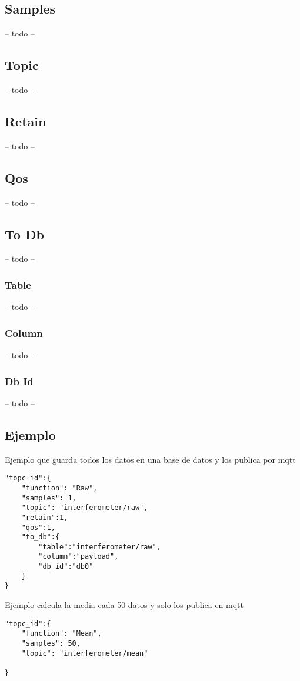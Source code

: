 \documentclass[12pt, a4paper, oneside, titlepage]{article}
\begin{document}
\subsection{Samples}
 -- todo --
 \subsection{Topic}
 -- todo --
 \subsection{Retain}
 -- todo --
 \subsection{Qos}
 -- todo --
 \subsection{To Db}
 -- todo --
 \subsubsection{Table}
 -- todo --
 \subsubsection{Column}
 -- todo --
 \subsubsection{Db Id}
 -- todo --
 
\subsection{Ejemplo}
Ejemplo que guarda todos los datos en una base de datos y los publica por mqtt

\begin{lstlisting}
"topc_id":{
	"function": "Raw",
	"samples": 1,
	"topic": "interferometer/raw",
	"retain":1,
	"qos":1,
	"to_db":{
		"table":"interferometer/raw",
		"column":"payload",
		"db_id":"db0"
	}
}
\end{lstlisting}

Ejemplo calcula la media cada 50 datos y solo los publica en mqtt
\begin{lstlisting}
"topc_id":{
	"function": "Mean",
	"samples": 50,
	"topic": "interferometer/mean"

}
\end{lstlisting}
\end{document}
